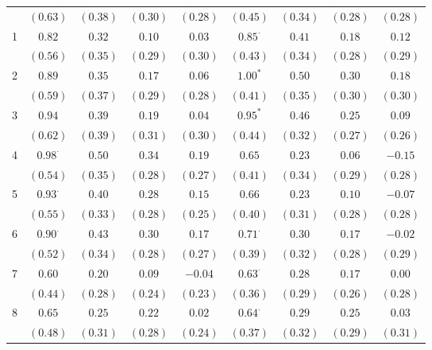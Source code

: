 \documentclass[12pt]{amsart}
\begin{document}
\begin{table}
\begin{center}
\begin{adjustbox}{width= 0.8\textwidth}
\begin{tabular}{l c c c c | c c c c}
   & $(0.63)$       & $(0.38)$ & $(0.30)$ & $(0.28)$        & $(0.45)$       & $(0.34)$ & $(0.28)$ & $(0.28)$ \\
1  & $0.82$         & $0.32$   & $0.10$   & $0.03$          & $0.85^{\cdot}$ & $0.41$   & $0.18$   & $0.12$   \\
   & $(0.56)$       & $(0.35)$ & $(0.29)$ & $(0.30)$        & $(0.43)$       & $(0.34)$ & $(0.28)$ & $(0.29)$ \\
2  & $0.89$         & $0.35$   & $0.17$   & $0.06$          & $1.00^{*}$     & $0.50$   & $0.30$   & $0.18$   \\
   & $(0.59)$       & $(0.37)$ & $(0.29)$ & $(0.28)$        & $(0.41)$       & $(0.35)$ & $(0.30)$ & $(0.30)$ \\
3  & $0.94$         & $0.39$   & $0.19$   & $0.04$          & $0.95^{*}$     & $0.46$   & $0.25$   & $0.09$   \\
   & $(0.62)$       & $(0.39)$ & $(0.31)$ & $(0.30)$        & $(0.44)$       & $(0.32)$ & $(0.27)$ & $(0.26)$ \\
4  & $0.98^{\cdot}$ & $0.50$   & $0.34$   & $0.19$          & $0.65$         & $0.23$   & $0.06$   & $-0.15$  \\
   & $(0.54)$       & $(0.35)$ & $(0.28)$ & $(0.27)$        & $(0.41)$       & $(0.34)$ & $(0.29)$ & $(0.28)$ \\
5  & $0.93^{\cdot}$ & $0.40$   & $0.28$   & $0.15$          & $0.66$         & $0.23$   & $0.10$   & $-0.07$  \\
   & $(0.55)$       & $(0.33)$ & $(0.28)$ & $(0.25)$        & $(0.40)$       & $(0.31)$ & $(0.28)$ & $(0.28)$ \\
6  & $0.90^{\cdot}$ & $0.43$   & $0.30$   & $0.17$          & $0.71^{\cdot}$ & $0.30$   & $0.17$   & $-0.02$  \\
   & $(0.52)$       & $(0.34)$ & $(0.28)$ & $(0.27)$        & $(0.39)$       & $(0.32)$ & $(0.28)$ & $(0.29)$ \\
7  & $0.60$         & $0.20$   & $0.09$   & $-0.04$         & $0.63^{\cdot}$ & $0.28$   & $0.17$   & $0.00$   \\
   & $(0.44)$       & $(0.28)$ & $(0.24)$ & $(0.23)$        & $(0.36)$       & $(0.29)$ & $(0.26)$ & $(0.28)$ \\
8  & $0.65$         & $0.25$   & $0.22$   & $0.02$          & $0.64^{\cdot}$ & $0.29$   & $0.25$   & $0.03$   \\
   & $(0.48)$       & $(0.31)$ & $(0.28)$ & $(0.24)$        & $(0.37)$       & $(0.32)$ & $(0.29)$ & $(0.31)$ \\

\end{tabular}
\end{adjustbox}
\end{center}
\end{table}
\end{document}
